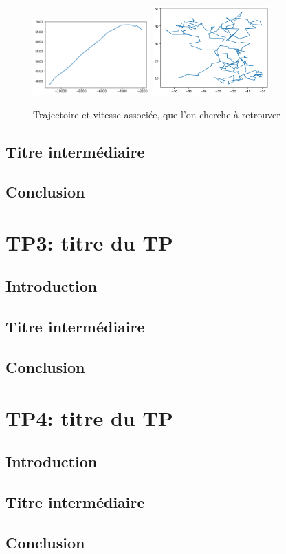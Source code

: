 \documentclass{article}
\begin{document}
\begin{figure}[ht]
\centering
\includegraphics[width=0.4\textwidth]{TP2/position_réelle.png}
\includegraphics[width=0.4\textwidth]{TP2/vitesse_reelle.png}
\caption{Trajectoire et vitesse associée, que l'on cherche à retrouver}
\end{figure}

\subsection{Titre intermédiaire}
\subsection{Conclusion}

\newpage
\section{TP3: titre du TP}
\subsection{Introduction}
\subsection{Titre intermédiaire}
\subsection{Conclusion}

\newpage
\section{TP4: titre du TP}
\subsection{Introduction}
\subsection{Titre intermédiaire}
\subsection{Conclusion}
\end{document}
